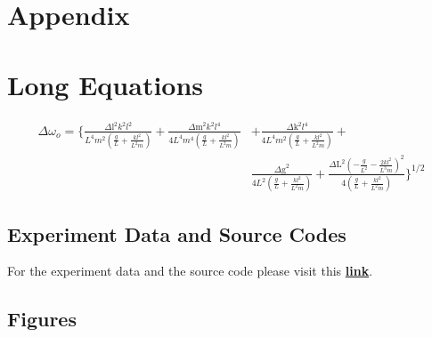 \documentclass[aps,prl,reprint,10pt,amsmath,amssymb,superscriptaddress,a4paper]{revtex4-2}
\begin{document}


\onecolumngrid
\newpage
\appendix
\section{Appendix}
\section{Long Equations}\label{LE}
\begin{equation}
    \begin{split}
        \Delta \omega_o = \Biggl\{\frac{\text{$\Delta $l}^2 k^2 l^2}{L^4 m^2 \left(\frac{g}{L}+\frac{k l^2}{L^2 m}\right)}+\frac{\text{$\Delta $m}^2 k^2 l^4}{4 L^4 m^4 \left(\frac{g}{L}+\frac{k l^2}{L^2 m}\right)}&+\frac{\text{$\Delta $k}^2 l^4}{4 L^4 m^2 \left(\frac{g}{L}+\frac{k l^2}{L^2 m}\right)}+\\
        &\frac{\text{$\Delta $g}^2}{4 L^2 \left(\frac{g}{L}+\frac{k l^2}{L^2 m}\right)}+\frac{\text{$\Delta $L}^2 \left(-\frac{g}{L^2}-\frac{2 k l^2}{L^3 m}\right)^2}{4 \left(\frac{g}{L}+\frac{k l^2}{L^2 m}\right)}\Biggr\}^{1/2} \label{eq7}
    \end{split}
\end{equation}
\subsection{Experiment Data and Source Codes}
For the experiment data and the source code please visit this \href{https://github.com/jojounderscorejo/CheatSheetRepo/tree/main/Otherthings/PHYS2113%20CP%20LAB}{\textbf{link}}.

\subsection{Figures}
\end{document}
